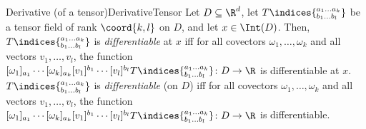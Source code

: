 \begin{dfn}{Derivative (of a tensor)}{DerivativeTensor}
Let $D\subseteq \R^d$, let $T\indices{^{a_1\dots a_k}_{b_1\dots b_l}}$ be a tensor field of rank $\coord{k,l}$ on $D$, and let $x\in \Int (D)$.  Then, $T\indices{^{a_1\ldots a_k}_{b_1\ldots b_l}}$ is \emph{differentiable} at $x$ iff for all covectors $\omega _1,\ldots ,\omega _k$ and all vectors $v_1,\ldots ,v_l$, the function $[\omega _1]_{a_1}\cdots [\omega _k]_{a_k}[v_1]^{b_1}\cdots [v_l]^{b_l}T\indices{^{a_1\dots a_k}_{b_1\dots b_l}}\colon D\rightarrow \R$ is differentiable at $x$.  $T\indices{^{a_1\dots a_k}_{b_1\dots b_l}}$ is \emph{differentiable} (on $D$) iff for all covectors $\omega _1,\ldots ,\omega _k$ and all vectors $v_1,\ldots ,v_l$, the function $[\omega _1]_{a_1}\cdots [\omega _k]_{a_k}[v_1]^{b_1}\cdots [v_l]^{b_l}T\indices{^{a_1\dots a_k}_{b_1\dots b_l}}\colon D\rightarrow \R$ is differentiable.
	

\end{dfn}
